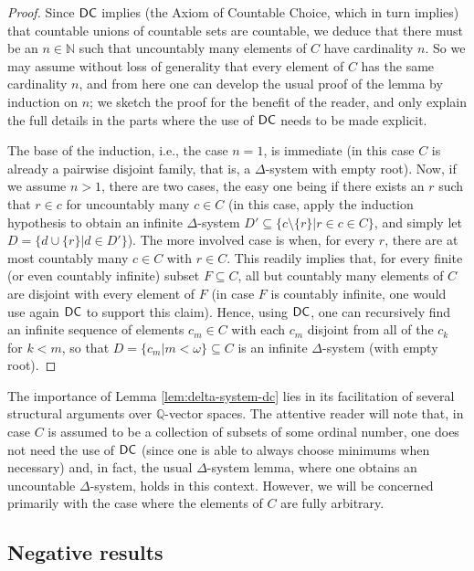 \documentclass{amsart}
\theoremstyle{definition}
\newcommand{\dc}{\mathnormal{\mathsf{DC}}}
\theoremstyle{remark}
\numberwithin{equation}{section}
\begin{document}
\begin{proof}
    Since $\dc$ implies (the Axiom of Countable Choice, which in turn implies) that countable unions of countable sets are countable, we deduce that there must be an $n\in\mathbb N$ such that uncountably many elements of $C$ have cardinality $n$. So we may assume without loss of generality that every element of $C$ has the same cardinality $n$, and from here one can develop the usual proof of the lemma by induction on $n$; we sketch the proof for the benefit of the reader, and only explain the full details in the parts where the use of $\dc$ needs to be made explicit.

    The base of the induction, i.e., the case $n=1$, is immediate (in this case $C$ is already a pairwise disjoint family, that is, a $\Delta$-system with empty root). Now, if we assume $n>1$, there are two cases, the easy one being if there exists an $r$ such that $r\in c$ for uncountably many $c\in C$ (in this case, apply the induction hypothesis to obtain an infinite $\Delta$-system $D'\subseteq\{c\setminus\{r\}\big|r\in c\in C\}$, and simply let $D=\{d\cup\{r\}\big|d\in D'\}$). The more involved case is when, for every $r$, there are at most countably many $c\in C$ with $r\in C$. This readily implies that, for every finite (or even countably infinite) subset $F\subseteq C$, all but countably many elements of $C$ are disjoint with every element of $F$ (in case $F$ is countably infinite, one would use again $\dc$ to support this claim). Hence, using $\dc$, one can recursively find an infinite sequence of elements $c_m\in C$ with each $c_m$ disjoint from all of the $c_k$ for $k<m$, so that $D=\{c_m\big|m<\omega\}\subseteq C$ is an infinite $\Delta$-system (with empty root).
\end{proof}


The importance of Lemma \ref{lem:delta-system-dc} lies in its facilitation of several structural arguments over $\mathbb Q$-vector spaces. The attentive reader will note that, in case $C$ is assumed to be a collection of subsets of some ordinal number, one does not need the use of $\dc$ (since one is able to always choose minimums when necessary) and, in fact, the usual $\Delta$-system lemma, where one obtains an uncountable $\Delta$-system, holds in this context. However, we will be concerned primarily with the case where the elements of $C$ are fully arbitrary.

\subsection{Negative results}\label{subsec:hindman-failures}
\end{document}
